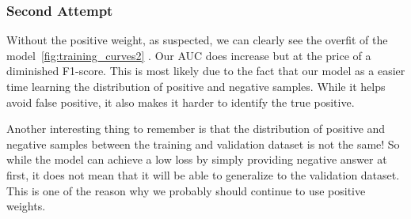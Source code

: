 \documentclass[11pt]{article}
\begin{document}
            \subsubsection{Second Attempt}
            
                Without the positive weight, as suspected, we can clearly see the overfit of the model~\ref{fig:training_curves2} .
                Our AUC does increase but at the price of a diminished F1-score. This is most likely due to the fact
                that our model as a easier time learning the distribution of positive and negative samples. While it
                helps avoid false positive, it also makes it harder to identify
                the true positive.

                Another interesting thing to remember is that the distribution of positive and negative samples between the training and validation
                dataset is not the same! So while the model can achieve a low loss by simply providing negative answer at first,
                it does not mean that it will be able to generalize to the validation dataset. This is one of the reason why we probably should continue to use
                positive weights.
\end{document}
